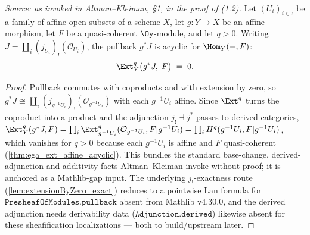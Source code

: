 \begin{theorem}
  \label{thm:extensionByZero_coprod_acyclic}
  \textit{Source: as invoked in Altman--Kleiman, §1, in the proof of (1.2).}
  Let $(U_i)_{i \in \iota}$ be a family of affine open subsets of a scheme $X$,
  let $g : Y \to X$ be an affine morphism, let $F$ be a quasi-coherent
  $\Oy$-module, and let $q > 0$. Writing
  $J = \coprod_i (j_{U_i})_!(\mathcal{O}_{U_i})$, the pullback $g^{*}J$ is acyclic
  for $\Hom_Y(-,F)$:
  \[
    \Ext^q_Y\bigl(g^{*}J,\; F\bigr) \;=\; 0 .
  \]
  \begin{proof}
    Pullback commutes with coproducts and with extension by zero, so
    $g^{*}J \cong \coprod_i (j_{g^{-1}U_i})_!(\mathcal{O}_{g^{-1}U_i})$ with each
    $g^{-1}U_i$ affine. Since $\Ext^q$ turns the coproduct into a product and the
    adjunction $j_! \dashv j^{*}$ passes to derived categories,
    $\Ext^q_Y(g^{*}J, F) = \prod_i \Ext^q_{g^{-1}U_i}(\mathcal{O}_{g^{-1}U_i},
    F|g^{-1}U_i) = \prod_i H^q(g^{-1}U_i, F|g^{-1}U_i)$, which vanishes for $q>0$
    because each $g^{-1}U_i$ is affine and $F$ quasi-coherent
    (\cref{thm:ega_ext_affine_acyclic}). This bundles the standard base-change,
    derived-adjunction and additivity facts Altman--Kleiman invoke without proof;
    it is anchored as a Mathlib-gap input. The underlying $j_!$-exactness route
    (\cref{lem:extensionByZero_exact}) reduces to a pointwise Lan formula for
    $\mathtt{PresheafOfModules.pullback}$ absent from Mathlib v4.30.0, and the
    derived adjunction needs derivability data ($\mathtt{Adjunction.derived}$)
    likewise absent for these sheafification localizations — both to
    build/upstream later.
  \end{proof}
\end{theorem}

